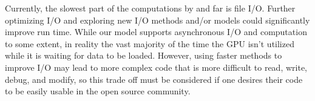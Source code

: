 \documentclass[journal]{IEEEtran}
\begin{document}
Currently, the slowest part of the computations by and far is file I/O. Further
optimizing I/O and exploring new I/O methods and/or models could significantly
improve run time. While our model supports asynchronous I/O and computation to
some extent, in reality the vast majority of the time the GPU isn't utilized
while it is waiting for data to be loaded. However, using faster methods to
improve I/O may lead to more complex code that is more difficult to read,
write, debug, and modify, so this trade off must be considered if one desires
their code to be easily usable in the open source community.

\ifCLASSOPTIONcaptionsoff
  \newpage
\fi





\end{document}
